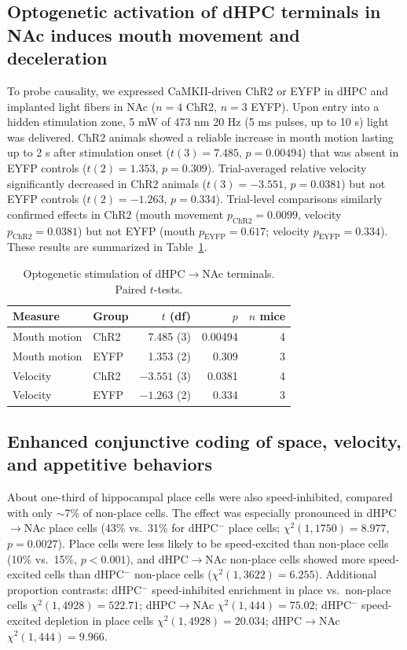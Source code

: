 \documentclass[10pt,a4paper]{article}
\begin{document}
\subsection{Optogenetic activation of dHPC terminals in NAc induces mouth movement and deceleration}
To probe causality, we expressed CaMKII-driven ChR2 or EYFP in dHPC and implanted light fibers in NAc ($n=4$ ChR2, $n=3$ EYFP). Upon entry into a hidden stimulation zone, 5 mW of 473 nm 20 Hz (5 ms pulses, up to 10 s) light was delivered. ChR2 animals showed a reliable increase in mouth motion lasting up to 2 s after stimulation onset ($t(3)=7.485$, $p=0.00494$) that was absent in EYFP controls ($t(2)=1.353$, $p=0.309$). Trial-averaged relative velocity significantly decreased in ChR2 animals ($t(3)=-3.551$, $p=0.0381$) but not EYFP controls ($t(2)=-1.263$, $p=0.334$). Trial-level comparisons similarly confirmed effects in ChR2 (mouth movement $p_{\text{ChR2}}=0.0099$, velocity $p_{\text{ChR2}}=0.0381$) but not EYFP (mouth $p_{\text{EYFP}}=0.617$; velocity $p_{\text{EYFP}}=0.334$). These results are summarized in Table~\ref{tab:opto}.

\begin{table}[h]
\centering
\caption{Optogenetic stimulation of dHPC$\rightarrow$NAc terminals. Paired $t$-tests.}
\label{tab:opto}
\begin{tabular}{llrrr}
\toprule
Measure & Group & $t$ (df) & $p$ & $n$ mice \\
\midrule
Mouth motion & ChR2 & 7.485 (3) & 0.00494 & 4 \\
Mouth motion & EYFP & 1.353 (2) & 0.309 & 3 \\
Velocity & ChR2 & $-3.551$ (3) & 0.0381 & 4 \\
Velocity & EYFP & $-1.263$ (2) & 0.334 & 3 \\
\bottomrule
\end{tabular}
\end{table}

\subsection{Enhanced conjunctive coding of space, velocity, and appetitive behaviors}
About one-third of hippocampal place cells were also speed-inhibited, compared with only $\sim$7\% of non-place cells. The effect was especially pronounced in dHPC$\rightarrow$NAc place cells (43\% vs.\ 31\% for dHPC$^{-}$ place cells; $\chi^2(1,1750)=8.977$, $p=0.0027$). Place cells were less likely to be speed-excited than non-place cells (10\% vs.\ 15\%, $p<0.001$), and dHPC$\rightarrow$NAc non-place cells showed more speed-excited cells than dHPC$^{-}$ non-place cells ($\chi^2(1,3622)=6.255$). Additional proportion contrasts: dHPC$^{-}$ speed-inhibited enrichment in place vs.\ non-place cells $\chi^2(1,4928)=522.71$; dHPC$\rightarrow$NAc $\chi^2(1,444)=75.02$; dHPC$^{-}$ speed-excited depletion in place cells $\chi^2(1,4928)=20.034$; dHPC$\rightarrow$NAc $\chi^2(1,444)=9.966$.
\end{document}
